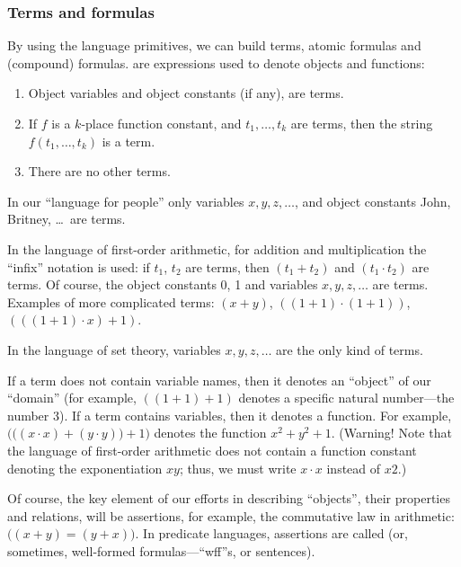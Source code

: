 \subsubsection*{Terms and formulas}

By using the language primitives, we can build terms, atomic formulas and (compound) formulas.
 are expressions used to denote objects and functions:

\begin{enumerate}
    \item Object variables and object constants (if any), are terms.
    \item If \(f\) is a \(k\)-place function constant, and \(t_1,\ldots,t_k\) are terms, then the string \(f(t_1,\ldots,t_k)\) is a term.
    \item There are no other terms.
\end{enumerate}

\begin{example}
In our ``language for people'' only variables \(x, y, z, \ldots\), and object constants John, Britney, \ldots\ are terms.
\end{example}

\begin{example}
In the language of first-order arithmetic, for addition and multiplication the ``infix'' notation is used: if \(t_1\), \(t_2\) are terms, then \((t_1+t_2)\) and \((t_1\cdot t_2)\) are terms.
Of course, the object constants 0, 1 and variables \(x, y, z, \ldots\) are terms.
Examples of more complicated terms: \((x+y)\), \(((1+1)\cdot (1+1))\), \((((1+1)\cdot x)+1)\).
\end{example}

\begin{example}
In the language of set theory, variables \(x, y, z, \ldots\)  are the only kind of terms.
\end{example}

If a term does not contain variable names, then it denotes an ``object'' of our ``domain'' (for example, \(((1+1)+1)\) denotes a specific natural number---the number 3).
If a term contains variables, then it denotes a function.
For example, \(\Big(\big((x\cdot x)+(y\cdot y)\big)+1\Big)\) denotes the function \(x^2+y^2+1.\)
(Warning! Note that the language of first-order arithmetic does not contain a function constant denoting the exponentiation \(xy\); thus, we must write \(x\cdot x\) instead of \(x2\).)

Of course, the key element of our efforts in describing ``objects'', their properties and relations, will be assertions, for example, the commutative law in arithmetic: \(\big((x+y)=(y+x)\big)\).
In predicate languages, assertions are called  (or, sometimes, well-formed formulas---``wff''s, or sentences).

